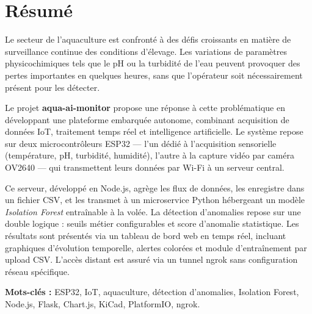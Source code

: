 \documentclass[12pt,a4paper]{report}
\begin{document}
\chapter*{Résumé}
\thispagestyle{fancy}

Le secteur de l'aquaculture est confronté à des défis croissants en matière de surveillance continue
des conditions d'élevage. Les variations de paramètres physicochimiques tels que le pH ou la turbidité
de l'eau peuvent provoquer des pertes importantes en quelques heures, sans que l'opérateur soit
nécessairement présent pour les détecter.

Le projet \textbf{aqua-ai-monitor} propose une réponse à cette problématique en développant une
plateforme embarquée autonome, combinant acquisition de données IoT, traitement temps réel et
intelligence artificielle. Le système repose sur deux microcontrôleurs ESP32 --- l'un dédié à l'acquisition
sensorielle (température, pH, turbidité, humidité), l'autre à la capture vidéo par caméra OV2640 ---
qui transmettent leurs données par Wi-Fi à un serveur central.

Ce serveur, développé en Node.js, agrège les flux de données, les enregistre dans un fichier CSV,
et les transmet à un microservice Python hébergeant un modèle \textit{Isolation Forest} entraînable
à la volée. La détection d'anomalies repose sur une double logique : seuils métier configurables
et score d'anomalie statistique. Les résultats sont présentés via un tableau de bord web en temps réel,
incluant graphiques d'évolution temporelle, alertes colorées et module d'entraînement par upload CSV.
L'accès distant est assuré via un tunnel ngrok sans configuration réseau spécifique.

\vspace{0.5cm}
\textbf{Mots-clés :} ESP32, IoT, aquaculture, détection d'anomalies, Isolation Forest,
Node.js, Flask, Chart.js, KiCad, PlatformIO, ngrok.

\clearpage

\tableofcontents
\clearpage

\listoffigures
{}
\clearpage

\listoftables
{}
\clearpage
\end{document}
